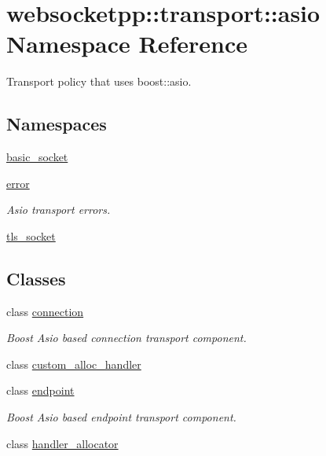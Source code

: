 \hypertarget{namespacewebsocketpp_1_1transport_1_1asio}{}\section{websocketpp\+:\+:transport\+:\+:asio Namespace Reference}
\label{namespacewebsocketpp_1_1transport_1_1asio}


Transport policy that uses boost\+::asio.  


\subsection*{Namespaces}
\begin{DoxyCompactItemize}
\item 
 \hyperlink{namespacewebsocketpp_1_1transport_1_1asio_1_1basic__socket}{basic\+\_\+socket}
\item 
 \hyperlink{namespacewebsocketpp_1_1transport_1_1asio_1_1error}{error}
\begin{DoxyCompactList}\small\item\em Asio transport errors. \end{DoxyCompactList}\item 
 \hyperlink{namespacewebsocketpp_1_1transport_1_1asio_1_1tls__socket}{tls\+\_\+socket}
\end{DoxyCompactItemize}
\subsection*{Classes}
\begin{DoxyCompactItemize}
\item 
class \hyperlink{classwebsocketpp_1_1transport_1_1asio_1_1connection}{connection}
\begin{DoxyCompactList}\small\item\em Boost Asio based connection transport component. \end{DoxyCompactList}\item 
class \hyperlink{classwebsocketpp_1_1transport_1_1asio_1_1custom__alloc__handler}{custom\+\_\+alloc\+\_\+handler}
\item 
class \hyperlink{classwebsocketpp_1_1transport_1_1asio_1_1endpoint}{endpoint}
\begin{DoxyCompactList}\small\item\em Boost Asio based endpoint transport component. \end{DoxyCompactList}\item 
class \hyperlink{classwebsocketpp_1_1transport_1_1asio_1_1handler__allocator}{handler\+\_\+allocator}
\end{DoxyCompactItemize}
